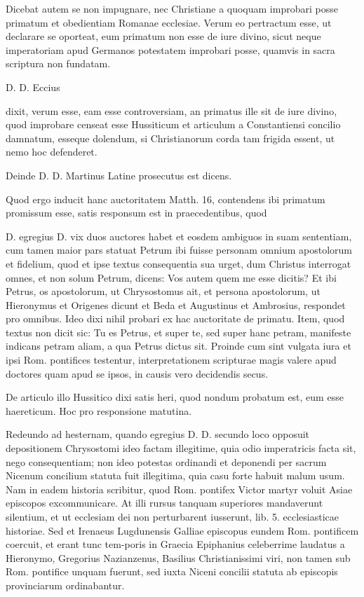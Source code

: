 Dicebat autem se non impugnare, nec Christiane a quoquam improbari posse primatum et obedientiam Romanae ecclesiae. Verum eo pertractum esse, ut declarare se oporteat, eum primatum non esse de iure divino, sicut neque imperatoriam apud Germanos potestatem improbari posse, quamvis in sacra scriptura non fundatam.

D. D. Eccius

dixit, verum esse, eam esse controversiam, an primatus ille sit de iure divino, quod improbare censeat esse Hussiticum et articulum a Constantiensi concilio damnatum, esseque dolendum, si Christianorum corda tam frigida essent, ut nemo hoc defenderet.

Deinde D. D. Martinus Latine prosecutus est dicens.

Quod ergo inducit hanc auctoritatem Matth. 16, contendens ibi primatum promissum esse, satis responsum est in praecedentibus, quod

D. egregius D. vix duos auctores habet et eosdem ambiguos in suam sententiam, cum tamen maior pars statuat Petrum ibi fuisse personam omnium apostolorum et fidelium, quod et ipse textus consequentia sua urget, dum Christus interrogat omnes, et non solum Petrum, dicens: Vos autem quem me esse dicitis? Et ibi Petrus, os apostolorum, ut Chrysostomus ait, et persona apostolorum, ut Hieronymus et Origenes dicunt et Beda et Augustinus et Ambrosius, respondet pro omnibus. Ideo dixi nihil probari ex hac auctoritate de primatu. Item, quod textus non dicit sic: Tu es Petrus, et super te, sed super hanc petram, manifeste indicans petram aliam, a qua Petrus dictus sit. Proinde cum sint vulgata iura et ipsi Rom. pontifices testentur, interpretationem scripturae magis valere apud doctores quam apud se ipsos, in causis vero decidendis secus.

De articulo illo Hussitico dixi satis heri, quod nondum probatum est, eum esse haereticum. Hoc pro responsione matutina.

Redeundo ad hesternam, quando egregius D. D. secundo loco opposuit depositionem Chrysostomi ideo factam illegitime, quia odio imperatricis facta sit, nego consequentiam; non ideo potestas ordinandi et deponendi per sacrum Nicenum concilium statuta fuit illegitima, quia casu forte habuit malum usum. Nam in eadem historia scribitur, quod Rom. pontifex Victor martyr voluit Asiae episcopos excommunicare. At illi rursus tanquam superiores mandaverunt silentium, et ut ecclesiam dei non perturbarent iusserunt, lib. 5. ecclesiasticae historiae. Sed et Irenaeus Lugdunensis Galliae episcopus eundem Rom. pontificem coercuit, et erant tunc tem-\marginpar{\small[300]}poris in Graecia Epiphanius celeberrime laudatus a Hieronymo, Gregorius Nazianzenus, Basilius Christianissimi viri, non tamen sub Rom. pontifice unquam fuerunt, sed iuxta Niceni concilii statuta ab episcopis provinciarum ordinabantur.

